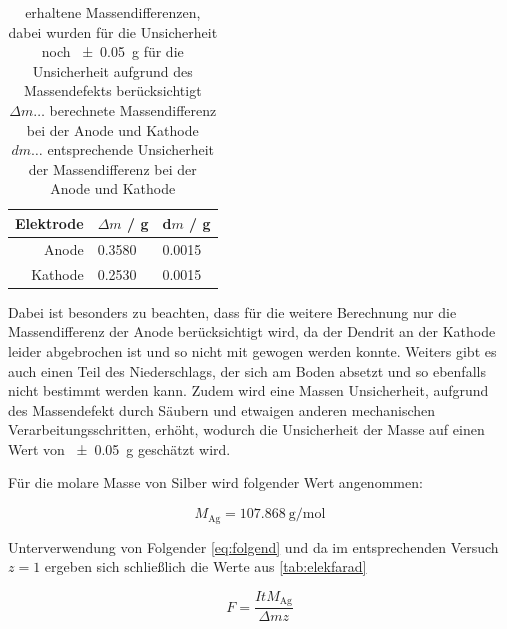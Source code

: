 \documentclass[11pt,ngerman]{scrartcl}
\begin{document}
\begin{table}[H]
	\caption{erhaltene Massendifferenzen, dabei wurden für die Unsicherheit noch \SI{+-0.05}{\g} für die Unsicherheit aufgrund des Massendefekts berücksichtigt \\
		$\Delta m \dots$ berechnete Massendifferenz bei der Anode und Kathode \\
		$dm \dots$ entsprechende Unsicherheit der Massendifferenz bei der Anode und Kathode}
	\label{tab:Massendifferenz}
	\begin{center}
		\begin{tabular}[c]{r|l|l}
			\hline
			\multicolumn{1}{c|}{\textbf{Elektrode}}   &
			\multicolumn{1}{c|}{$\Delta m$ / \si{\g}} &
			\multicolumn{1}{c}{d$m$ / \si{\g}}                          \\
			\hline
			Anode                                     & 0.3580 & 0.0015 \\
			Kathode                                   & 0.2530 & 0.0015 \\
			\hline
		\end{tabular}
	\end{center}
\end{table}




Dabei ist besonders zu beachten, dass für die weitere Berechnung nur die
Massendifferenz der Anode berücksichtigt wird, da der Dendrit an der Kathode
leider abgebrochen ist und so nicht mit gewogen werden konnte. Weiters gibt es
auch einen Teil des Niederschlags, der sich am Boden absetzt und so ebenfalls
nicht bestimmt werden kann. Zudem wird eine Massen Unsicherheit, aufgrund des
Massendefekt durch Säubern und etwaigen anderen mechanischen
Verarbeitungsschritten, erhöht, wodurch die Unsicherheit der Masse auf einen Wert von \SI{+-0.05}{\g} geschätzt wird.

Für die molare Masse von Silber wird folgender Wert angenommen: \cite{Kuchling}

\begin{equation}
	M_{\text{Ag}} = \SI{107.868}{\g\per\mol}
	\label{eq:molmassesilber}
\end{equation}

Unterverwendung von Folgender \autoref{eq:folgend} und da im entsprechenden Versuch $z=1$ ergeben sich schließlich die Werte aus \autoref{tab:elekfarad}

\begin{equation}
	F = \frac{ItM_{\text{Ag}}}{\Delta mz}
	\label{eq:folgend}
\end{equation}
\end{document}
